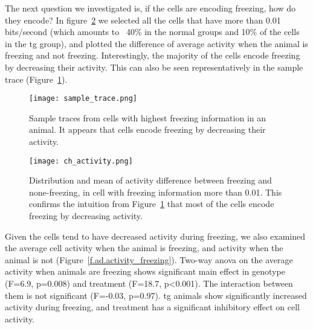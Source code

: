 The next question we investigated is, if the cells are encoding freezing, how do they encode? In figure~\ref{f.ad.ch_activity} we selected all the cells that have more than 0.01 bits/second (which amounts to ~40\% in the normal groups and 10\% of the cells in the \gls{tg} group), and plotted the difference of average activity when the animal is freezing and not freezing. Interestingly, the majority of the cells encode freezing by decreasing their activity. This can also be seen representatively in the sample trace (Figure~\ref{f.ad.sample_trace}).
\begin{figure}[h]
    \texttt{[image: sample\_trace.png]}
    \caption{Sample traces from cells with highest freezing information in an animal. It appears that cells encode freezing by decreasing their activity. \label{f.ad.sample_trace}}
\end{figure}
\begin{figure}[h]
    \texttt{[image: ch\_activity.png]}
    \caption{Distribution and mean of activity difference between freezing and none-freezing, in cell with freezing information more than 0.01. This confirms the intuition from Figure~\ref{f.ad.sample_trace} that most of the cells encode freezing by decreasing activity. \label{f.ad.ch_activity}}
\end{figure}

Given the cells tend to have decreased activity during freezing, we also examined the average cell activity when the animal is freezing, and activity when the animal is not (Figure~\ref{f.ad.activity_freezing}). Two-way \gls{anova} on the average activity when animals are freezing shows significant main effect in genotype (F=6.9, p=0.008) and treatment (F=18.7, p<0.001). The interaction between them is not significant (F=-0.03, p=0.97). \Gls{tg} animals show significantly increased activity during freezing, and \tglu treatment has a significant inhibitory effect on cell activity. 

